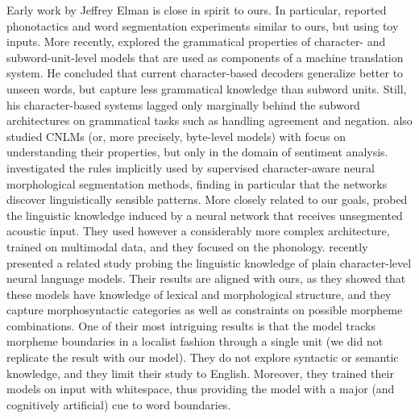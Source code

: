 Early work by Jeffrey Elman is close in spirit to ours. In particular,
 reported phonotactics and word segmentation
experiments similar to ours, but using toy inputs. More recently,
 explored the grammatical properties of
character- and subword-unit-level models that are used as components
of a machine translation system. He concluded that current
character-based decoders generalize better to unseen words, but
capture less grammatical knowledge than subword units. Still, his
character-based systems lagged only marginally behind the subword
architectures on grammatical tasks such as handling agreement and
negation.  also studied CNLMs (or, more
precisely, byte-level models) with focus on understanding their
properties, but only in the domain of sentiment
analysis.  investigated the rules implicitly
used by supervised character-aware neural morphological segmentation
methods, finding in particular that the networks discover
linguistically sensible patterns. More closely related to our goals,
 probed the linguistic knowledge induced by
a neural network that receives unsegmented acoustic input. They used
however a considerably more complex architecture, trained on
multimodal data, and they focused on the phonology.  recently presented a related study
probing the linguistic knowledge of plain character-level neural
language models. Their results are aligned with ours, as they showed
that these models have knowledge of lexical and morphological
structure, and they capture morphosyntactic categories as well as
constraints on possible morpheme combinations. One of their most
intriguing results is that the model tracks morpheme boundaries in a
localist fashion through a single unit (we did not replicate the
result with our model).  They do not explore syntactic or semantic
knowledge, and they limit their study to English. Moreover, they
trained their models on input with whitespace, thus providing the
model with a major (and cognitively artificial) cue to word
boundaries.


